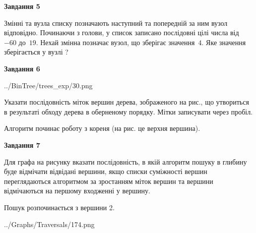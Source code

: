 \documentclass[12pt, ukrainian]{article}
\begin{document}
{\begin {large}
{\begin {center}\textbf{Завдання 5}\end {center}}\par
Змінні  та  вузла списку позначають наступний та попередній за ним вузол відповідно. Починаючи з голови, у список записано послідовні цілі числа від~$-60$ до~$19$. Нехай змінна  позначає вузол, що зберігає значення~$4$.
Яке значення зберігається у вузлі  ?\par
\newpage

{\begin {center}\textbf{Завдання 6}\end {center}}\par

\begin{center}
	{../BinTree/trees_exp/30.png}
\end{center}
Указати послідовність міток вершин дерева, зображеного на рис., що утвориться в результаті обходу дерева в оберненому порядку. Мітки записувати через пробіл.\par Алгоритм починає роботу з кореня (на рис. це верхня вершина).\par
\newpage

{\begin {center}\textbf{Завдання 7}\end {center}}\par
Для графа на рисунку вказати послідовність, в якій алгоритм пошуку в глибину буде відмічати відвідані вершини, якщо списки суміжності вершин переглядаються алгоритмом за зростанням міток вершин та вершини відмічаються на першому вход\-женні у вершину.\par
Пошук розпочинається з вершини 2.\par

\begin{center}
	{../Graphs/Traversals/174.png}
\end{center}\par
\newpage


\end{large}}
\end{document}
